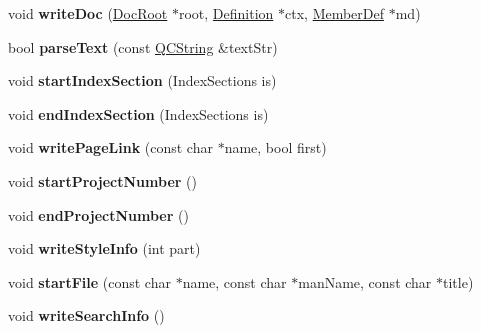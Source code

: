 \begin{DoxyCompactItemize}
\item 
\mbox{\label{class_output_list_ab7f31928be80a659ed3e394e61ab0323}} 
void {\bfseries write\+Doc} (\mbox{\hyperlink{class_doc_root}{Doc\+Root}} $\ast$root, \mbox{\hyperlink{class_definition}{Definition}} $\ast$ctx, \mbox{\hyperlink{class_member_def}{Member\+Def}} $\ast$md)
\item 
\mbox{\label{class_output_list_ad094ea058825f0c0a7afb579af1bfc4a}} 
bool {\bfseries parse\+Text} (const \mbox{\hyperlink{class_q_c_string}{Q\+C\+String}} \&text\+Str)
\item 
\mbox{\label{class_output_list_a678ace51eccae14090a4edd88a255bc3}} 
void {\bfseries start\+Index\+Section} (Index\+Sections is)
\item 
\mbox{\label{class_output_list_a6468fd401e46c0b28ffb2f3189d3078a}} 
void {\bfseries end\+Index\+Section} (Index\+Sections is)
\item 
\mbox{\label{class_output_list_ad8981d3a92e71f581980476e284c5258}} 
void {\bfseries write\+Page\+Link} (const char $\ast$name, bool first)
\item 
\mbox{\label{class_output_list_a5e35c28c310e74b57645aff8119c1546}} 
void {\bfseries start\+Project\+Number} ()
\item 
\mbox{\label{class_output_list_ad6faf5debd750bf3fb143ffc571a0d22}} 
void {\bfseries end\+Project\+Number} ()
\item 
\mbox{\label{class_output_list_a85fc0afe789c21758373df15bcb81cc9}} 
void {\bfseries write\+Style\+Info} (int part)
\item 
\mbox{\label{class_output_list_a9254223c5951e1202a5bd131a8f1efb2}} 
void {\bfseries start\+File} (const char $\ast$name, const char $\ast$man\+Name, const char $\ast$title)
\item 
\mbox{\label{class_output_list_a0b776a7ac371d841b15862b074ddd97f}} 
void {\bfseries write\+Search\+Info} ()
\item 

\end{DoxyCompactItemize}
